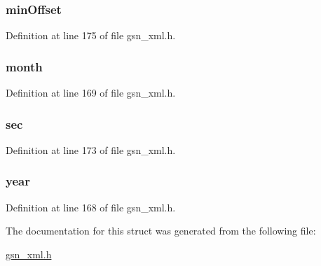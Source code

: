 \hypertarget{a00432_ab33c78dee679b2e12fbc4a8f3ae4c933}{
\subsubsection[{minOffset}]{ {\bf minOffset}}}
\label{a00432_ab33c78dee679b2e12fbc4a8f3ae4c933}


Definition at line 175 of file gsn\_\-xml.h.

\hypertarget{a00432_a9a7060ed27a8fc1c0a801ca792fbc955}{
\subsubsection[{month}]{ {\bf month}}}
\label{a00432_a9a7060ed27a8fc1c0a801ca792fbc955}


Definition at line 169 of file gsn\_\-xml.h.

\hypertarget{a00432_a2edad25d34a288a33b77f09dfc71faa5}{
\subsubsection[{sec}]{ {\bf sec}}}
\label{a00432_a2edad25d34a288a33b77f09dfc71faa5}


Definition at line 173 of file gsn\_\-xml.h.

\hypertarget{a00432_a15cf81be0bc3b33c7cc971ed1a815c74}{
\subsubsection[{year}]{ {\bf year}}}
\label{a00432_a15cf81be0bc3b33c7cc971ed1a815c74}


Definition at line 168 of file gsn\_\-xml.h.



The documentation for this struct was generated from the following file:\begin{DoxyCompactItemize}
\item 
\hyperlink{a00616}{gsn\_\-xml.h}\end{DoxyCompactItemize}
